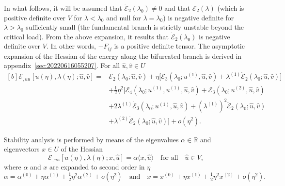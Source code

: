 \documentclass[12pt, final]{scrartcl}
\theoremstyle{definition}
\newcommand{\E}{\mathcal E}
\newcommand{\order}[2][1]{#2^{(#1)}}
\newcommand{\reals}{\mathbb{R}}
\begin{document}
In what follows, it will be assumed that $\dot{\E}_2(\lambda_0)≠0$ and that $\E_2(\lambda)$
(which is positive definite over $V$ for $\lambda<\lambda_0$ and null for $\lambda=\lambda_0$) is
negative definite for $\lambda>\lambda_0$ sufficiently small (the fundamental branch is
strictly unstable beyond the critical load). From the above expansion, it
results that $\dot{\E}_2(\lambda_0)$ is negative definite over $V$. In other words,
$-F_{ij}$ is a positive definite tensor. The asymptotic expansion of the
Hessian of the energy along the bifurcated branch is derived in
appendix~\ref{sec:20220616055207}. For all $\hat{u}, \hat{v} \in U$
\begin{equation}
  \label{eq:20220531054247}
  \begin{aligned}[b]
    \E_{, uu}[u(\eta), \lambda(\eta); \hat{u}, \hat{v}] ={}
    & \E_2(\lambda_0 ; \hat{u}, \hat{v}) + \eta \bigl[\E_3(\lambda_0 ; \order[1]u, \hat{u}, \hat{v})  + \order[1]\lambda \dot{\E}_2(\lambda_0; \hat{u}, \hat{v})\bigr]\\
    &+ \tfrac{1}{2} \eta^2 \bigl[\E_4(\lambda_0; \order[1]u, \order[1]u, \hat{u}, \hat{v}) + \E_3(\lambda_0; \order[2]u, \hat{u}, \hat{v})\\
    & + 2\order[1]\lambda \dot{\E}_3(\lambda_0; \order[1]u, \hat{u}, \hat{v}) + ( \order[1]\lambda )^2 \ddot{\E}_2(\lambda_0; \hat{u}, \hat{v})\\
    & + \order[2]\lambda \dot{\E}_2(\lambda_0; \hat{u}, \hat{v}) \bigr] + o(\eta^2).
  \end{aligned}
\end{equation}

Stability analysis is performed by means of the eigenvalues $α \in \reals$ and
eigenvectors $x \in U$ of the Hessian
\begin{equation}
  \label{eq:20220617074949}
  \E_{, u u} [u(\eta), \lambda(\eta); x, \hat{u}] = α \langle x, \hat{u} \rangle \quad \text{for all} \quad \hat{u} \in V,
\end{equation}
where $α$ and $x$ are expanded to second order in $\eta$
\begin{equation}
  \label{eq:20220617064633}
  α = \order[0]α + \eta \order[1]α + \tfrac{1}{2} \eta^2 \order[2]α + o(\eta^2)
  \quad \text{and} \quad
  x = \order[0]x + \eta \order[1]x + \tfrac{1}{2} \eta^2 \order[2]x + o(\eta^2).
\end{equation}
\end{document}
